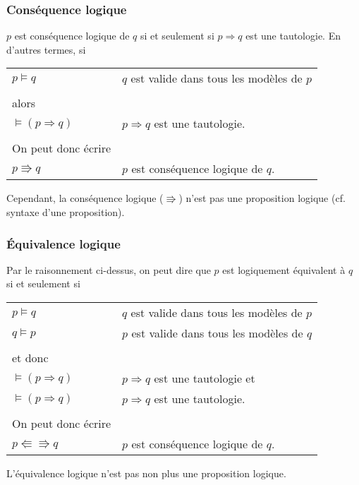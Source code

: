 		\subsubsection{Conséquence logique}
			$p$ est conséquence logique de $q$ si et seulement si $p \Rightarrow q$ est une tautologie. En d'autres termes, si
			\begin{center}
			\begin{tabular}{ll}
			$p \models q$ & $q$ est valide dans tous les modèles de $p$ \\
			&\\
			alors & \\
			$\models (p \Rightarrow q)$ & $p \Rightarrow q$ est une tautologie.\\
			&\\
			On peut donc écrire & \\
			$p \Rrightarrow q$ & $p$ est conséquence logique de $q$.\\
			\end{tabular}
			\end{center}
			Cependant, la conséquence logique ($\Rrightarrow$) n'est pas une proposition logique (cf. syntaxe d'une proposition).
		
		\subsubsection{Équivalence logique}
			Par le raisonnement ci-dessus, on peut dire que $p$ est logiquement équivalent à $q$ si et seulement si
			\begin{center}
			\begin{tabular}{ll}
			$p \models q$ & $q$ est valide dans tous les modèles de $p$ \\
			$q \models p$ & $p$ est valide dans tous les modèles de $q$ \\
			&\\
			et donc & \\
			$\models (p \Rightarrow q)$ & $p \Rightarrow q$ est une tautologie et\\
			$\models (p \Rightarrow q)$ & $p \Rightarrow q$ est une tautologie.\\
			&\\
			On peut donc écrire & \\
			$p \Lleftarrow \Rrightarrow q$ & $p$ est conséquence logique de $q$.\\ 
			\end{tabular}
			\end{center}
			L'équivalence logique n'est pas non plus une proposition logique.\\
			
